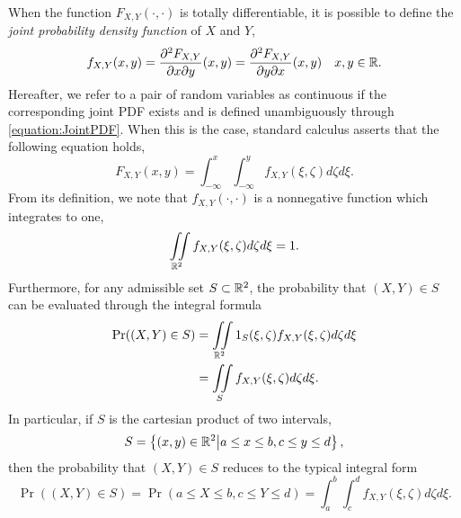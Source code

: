 When the function $F_{X,Y} (\cdot, \cdot)$ is totally differentiable, it is possible to define the \emph{joint probability density function} of $X$ and $Y$, 
\begin{equation} \label{equation:JointPDF}
f_{X,Y} (x,y) = \frac{\partial^2 F_{X,Y}}{\partial x \partial y} (x,y)
= \frac{\partial^2 F_{X,Y}}{\partial y \partial x} (x,y) \quad x,y \in  \mathbb{R} .
\end{equation}
Hereafter, we refer to a pair of random variables as continuous if the corresponding joint PDF exists and is defined unambiguously through \eqref{equation:JointPDF}.
When this is the case, standard calculus asserts that the following equation holds,
\begin{equation*}
F_{X,Y} (x,y) = \int_{-\infty}^x \int_{-\infty}^y f_{X,Y} (\xi,\zeta) d\zeta d\xi .
\end{equation*}
From its definition, we note that $f_{X,Y} (\cdot, \cdot)$ is a nonnegative function which integrates to one,
\begin{equation*}
\iint\limits_{\mathbb{R}^2}
f_{X, Y} (\xi, \zeta) d\zeta d\xi = 1.
\end{equation*}
Furthermore, for any admissible set $S \subset \mathbb{R}^2$, the probability that $(X,Y) \in S$ can be evaluated through the integral formula
\begin{equation} \label{equation:ProbabilityJointPDF}
\begin{split}
\Pr ((X,Y) \in S)
&= \iint\limits_{\mathbb{R}^2}
\mathrm{1}_{S}(\xi, \zeta) f_{X, Y} (\xi, \zeta) d\zeta d\xi \\
&= \iint\limits_{S}
f_{X, Y} (\xi, \zeta) d\zeta d\xi .
\end{split}
\end{equation}
In particular, if $S$ is the cartesian product of two intervals, 
\begin{equation*}
S = \left\{ (x,y) \in \mathbb{R}^2 \big| a \leq x \leq b, c \leq y \leq d \right\} ,
\end{equation*}
then the probability that $(X,Y) \in S$ reduces to the typical integral form
\begin{equation*}
\Pr ((X,Y) \in S)
= \Pr (a \leq X \leq b, c \leq Y \leq d)
= \int_{a}^{b} \int_{c}^{d}
f_{X, Y} (\xi, \zeta) d\zeta d\xi .
\end{equation*}

